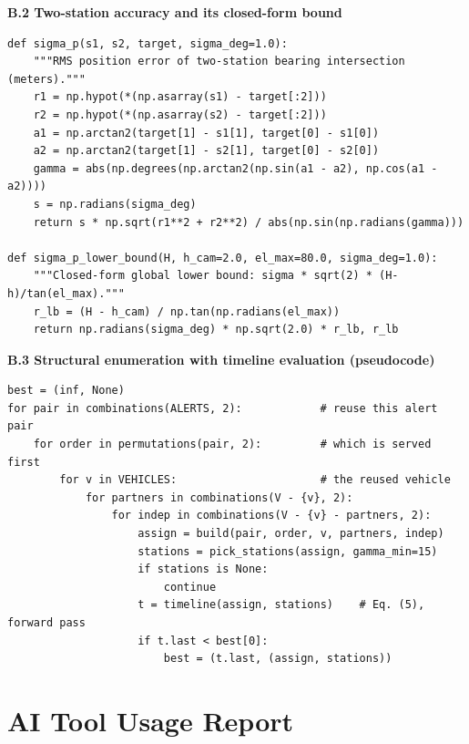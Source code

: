 \documentclass[12pt]{article}
\begin{document}
\noindent\textbf{B.2 Two-station accuracy and its closed-form bound}
\begin{lstlisting}
def sigma_p(s1, s2, target, sigma_deg=1.0):
    """RMS position error of two-station bearing intersection (meters)."""
    r1 = np.hypot(*(np.asarray(s1) - target[:2]))
    r2 = np.hypot(*(np.asarray(s2) - target[:2]))
    a1 = np.arctan2(target[1] - s1[1], target[0] - s1[0])
    a2 = np.arctan2(target[1] - s2[1], target[0] - s2[0])
    gamma = abs(np.degrees(np.arctan2(np.sin(a1 - a2), np.cos(a1 - a2))))
    s = np.radians(sigma_deg)
    return s * np.sqrt(r1**2 + r2**2) / abs(np.sin(np.radians(gamma)))

def sigma_p_lower_bound(H, h_cam=2.0, el_max=80.0, sigma_deg=1.0):
    """Closed-form global lower bound: sigma * sqrt(2) * (H-h)/tan(el_max)."""
    r_lb = (H - h_cam) / np.tan(np.radians(el_max))
    return np.radians(sigma_deg) * np.sqrt(2.0) * r_lb, r_lb
\end{lstlisting}

\noindent\textbf{B.3 Structural enumeration with timeline evaluation (pseudocode)}
\begin{lstlisting}
best = (inf, None)
for pair in combinations(ALERTS, 2):            # reuse this alert pair
    for order in permutations(pair, 2):         # which is served first
        for v in VEHICLES:                      # the reused vehicle
            for partners in combinations(V - {v}, 2):
                for indep in combinations(V - {v} - partners, 2):
                    assign = build(pair, order, v, partners, indep)
                    stations = pick_stations(assign, gamma_min=15)
                    if stations is None:
                        continue
                    t = timeline(assign, stations)    # Eq. (5), forward pass
                    if t.last < best[0]:
                        best = (t.last, (assign, stations))
\end{lstlisting}

\section{AI Tool Usage Report}
\end{document}
